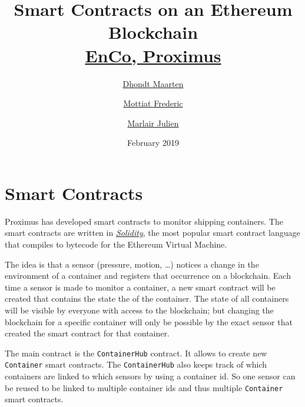 \documentclass[12pt]{article}
\title{\vspace{-3cm}Smart Contracts on an Ethereum Blockchain\\\href{https://www.enco.io}{EnCo, Proximus}}
\author[1]{\href{mailto:maarten.dhondt@realdolmen.com}{Dhondt Maarten}}
\author[2]{\href{mailto:frederic.mottiat@proximus.com}{Mottiat Frederic}}
\author[2]{\href{mailto:julien.marlair@proximus.com}{Marlair Julien}}
\affil[1]{Blockchain Developer, Realdolmen}
\affil[2]{Business Innovation \& Development Manager, Proximus}
\date{February 2019}
\begin{document}
\maketitle
\thispagestyle{empty}

\section{Smart Contracts}
Proximus has developed smart contracts to monitor shipping containers. The smart contracts are written in \href{https://solidity.readthedocs.io/en/latest/}{\emph{Solidity}}, the most popular smart contract language that compiles to bytecode for the Ethereum Virtual Machine.

The idea is that a sensor (pressure, motion, \ldots) notices a change in the environment of a container and registers that occurrence on a blockchain. Each time a sensor is made to monitor a container, a new smart contract will be created that contains the state the of the container. The state of all containers will be visible by everyone with access to the blockchain; but changing the blockchain for a specific container will only be possible by the exact sensor that created the smart contract for that container.

The main contract is the \texttt{ContainerHub} contract. It allows to create new \texttt{Container} smart contracts. The \texttt{ContainerHub} also keeps track of which containers are linked to which sensors by using a container id. So one sensor can be reused to be linked to multiple container ids and thus multiple \texttt{Container} smart contracts.
\end{document}
